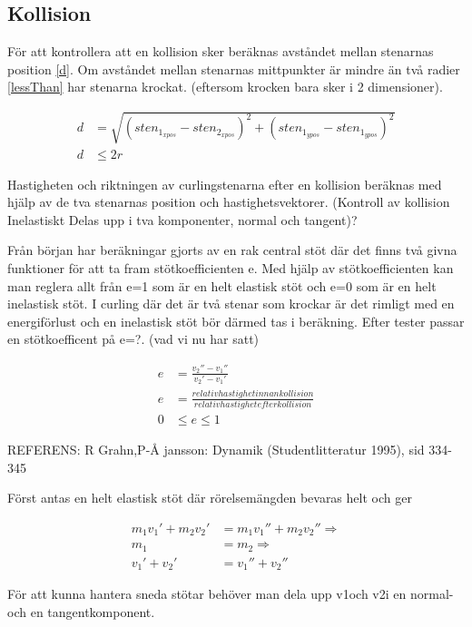 \documentclass[11pt]{article} %
\begin{document}
\subsection{Kollision}

För att kontrollera att en kollision sker beräknas avståndet mellan stenarnas position \eqref{d}.
Om avståndet mellan stenarnas mittpunkter är mindre än två radier \eqref{lessThan} har stenarna krockat.  (eftersom krocken bara sker i 2 dimensioner). 

 \begin{align}\label{d}
 d& = \sqrt{(sten_{1_{xpos}} - sten_{2_{xpos}})^2   +   (sten_{1_{ypos}}-sten_{1_{ypos}})^2}\\\label{lessThan}
 d& \le 2 r
 \end{align}

Hastigheten och riktningen av curlingstenarna efter en kollision beräknas med hjälp av de tva stenarnas position och hastighetsvektorer.
(Kontroll av kollision Inelastiskt Delas upp i tva komponenter, normal och tangent)?

Från början har beräkningar gjorts av en rak central stöt där det finns två givna funktioner för att ta fram stötkoefficienten e. Med hjälp av stötkoefficienten kan man reglera allt från e=1 som är en helt elastisk stöt och e=0 som är en helt inelastisk stöt. I curling där det är två stenar som krockar är det rimligt med en energiförlust och en inelastisk stöt bör därmed tas i beräkning. Efter tester passar en stötkoefficent på e=?. (vad vi nu har satt)

 \begin{align}\label{e1}
 e& = \frac{v_2''-v_1''}{v_2'-v_1'}\\
 e& = \frac{relativ hastighet innan kollision}{relativ hastighet efter kollision}\\
0& \le e \le 1
 \end{align}

REFERENS: R Grahn,P-Å jansson: Dynamik (Studentlitteratur 1995), sid 334-345

Först antas en helt elastisk stöt där rörelsemängden bevaras helt och ger

 \begin{align}\label{elastisk}
m_1 v_1' + m_2 v_2'& = m_1 v_1'' + m_2 v_2'' \Rightarrow\\
m_1& = m_2 \Rightarrow\\
v_1' + v_2'& = v_1'' + v_2''
 \end{align}

För att kunna hantera sneda stötar behöver man dela upp v1och v2i en normal- och en tangentkomponent. 
\end{document}
